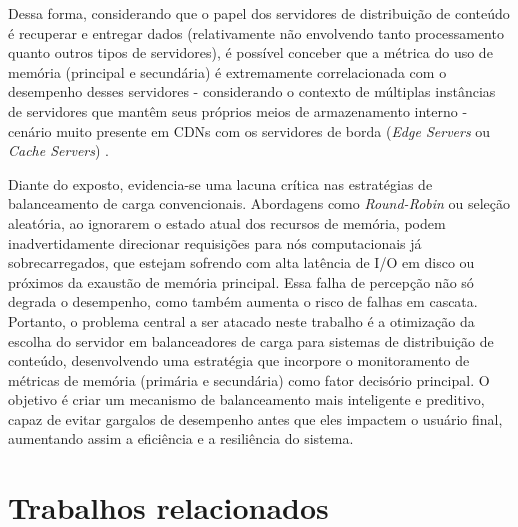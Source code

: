 Dessa forma, considerando que o papel dos servidores de distribuição de conteúdo é recuperar e entregar dados (relativamente não envolvendo tanto processamento quanto outros tipos de servidores), é possível conceber que a métrica do uso de memória (principal e secundária) é extremamente correlacionada com o desempenho desses servidores - considerando o contexto de múltiplas instâncias de servidores que mantêm seus próprios meios de armazenamento interno - cenário muito presente em CDNs com os servidores de borda (\textit{Edge Servers} ou \textit{Cache Servers}) \cite{surveyCDNArchitectures2025}.

Diante do exposto, evidencia-se uma lacuna crítica nas estratégias de balanceamento de carga convencionais. Abordagens como \textit{Round-Robin} ou seleção aleatória, ao ignorarem o estado atual dos recursos de memória, podem inadvertidamente direcionar requisições para nós computacionais já sobrecarregados, que estejam sofrendo com alta latência de I/O em disco ou próximos da exaustão de memória principal. Essa falha de percepção não só degrada o desempenho, como também aumenta o risco de falhas em cascata. Portanto, o problema central a ser atacado neste trabalho é a otimização da escolha do servidor em balanceadores de carga para sistemas de distribuição de conteúdo, desenvolvendo uma estratégia que incorpore o monitoramento de métricas de memória (primária e secundária) como fator decisório principal. O objetivo é criar um mecanismo de balanceamento mais inteligente e preditivo, capaz de evitar gargalos de desempenho antes que eles impactem o usuário final, aumentando assim a eficiência e a resiliência do sistema.

\section{Trabalhos relacionados}

